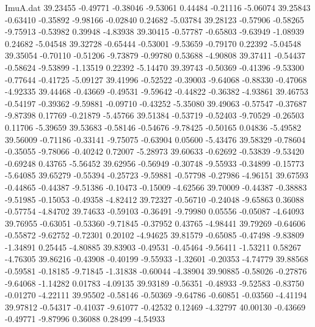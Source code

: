 \begin{filecontents}{ImuA.dat}
  39.23455   -0.49771   -0.38046   -9.53061    0.44484   -0.21116   -5.06074
  39.25843   -0.63410   -0.35892   -9.98166   -0.02840    0.24682   -5.03784
  39.28123   -0.57906   -0.58265   -9.75913   -0.53982    0.39948   -4.83938
  39.30415   -0.57787   -0.65803   -9.63949   -1.08939    0.24682   -5.04548
  39.32728   -0.65444   -0.53001   -9.53659   -0.79170    0.22392   -5.04548
  39.35054   -0.70110   -0.51206   -9.73879   -0.99780    0.53688   -4.90808
  39.37411   -0.54437   -0.58624   -9.53899   -1.13519    0.22392   -5.14470
  39.39743   -0.50369   -0.41396   -9.53300   -0.77644   -0.41725   -5.09127
  39.41996   -0.52522   -0.39003   -9.64068   -0.88330   -0.47068   -4.92335
  39.44468   -0.43669   -0.49531   -9.59642   -0.44822   -0.36382   -4.93861
  39.46753   -0.54197   -0.39362   -9.59881   -0.09710   -0.43252   -5.35080
  39.49063   -0.57547   -0.37687   -9.87398    0.17769   -0.21879   -5.45766
  39.51384   -0.53719   -0.52403   -9.70529   -0.26503    0.11706   -5.39659
  39.53683   -0.58146   -0.54676   -9.78425   -0.50165    0.04836   -5.49582
  39.56009   -0.71186   -0.33141   -9.75075   -0.63904    0.05600   -5.43476
  39.58329   -0.78604   -0.35055   -9.78066   -0.40242    0.72007   -5.28973
  39.60633   -0.62692   -0.53839   -9.53420   -0.69248    0.43765   -5.56452
  39.62956   -0.56949   -0.30748   -9.55933   -0.34899   -0.15773   -5.64085
  39.65279   -0.55394   -0.25723   -9.59881   -0.57798   -0.27986   -4.96151
  39.67593   -0.44865   -0.44387   -9.51386   -0.10473   -0.15009   -4.62566
  39.70009   -0.44387   -0.38883   -9.51985   -0.15053   -0.49358   -4.82412
  39.72327   -0.56710   -0.24048   -9.65863    0.36088   -0.57754   -4.84702
  39.74633   -0.59103   -0.36491   -9.79980    0.05556   -0.05087   -4.64093
  39.76955   -0.63051   -0.53360   -9.71845   -0.37952    0.43765   -4.98441
  39.79269   -0.64606   -0.55872   -9.62752   -0.72301    0.20102   -4.94625
  39.81579   -0.65085   -0.47498   -9.83809   -1.34891    0.25445   -4.80885
  39.83903   -0.49531   -0.45464   -9.56411   -1.53211    0.58267   -4.76305
  39.86216   -0.43908   -0.40199   -9.55933   -1.32601   -0.20353   -4.74779
  39.88568   -0.59581   -0.18185   -9.71845   -1.31838   -0.60044   -4.38904
  39.90885   -0.58026   -0.27876   -9.64068   -1.14282    0.01783   -4.09135
  39.93189   -0.56351   -0.48933   -9.52583   -0.83750   -0.01270   -4.22111
  39.95502   -0.58146   -0.50369   -9.64786   -0.60851   -0.03560   -4.41194
  39.97812   -0.54317   -0.41037   -9.61077   -0.42532    0.12469   -4.32797
  40.00130   -0.43669   -0.49771   -9.87996    0.36088    0.28499   -4.54933

\end{filecontents}
